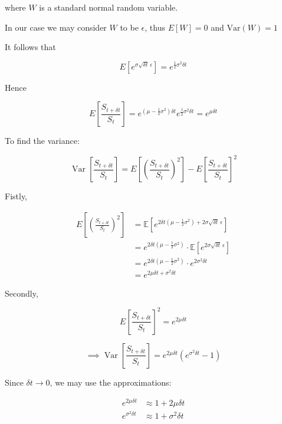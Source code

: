 \documentclass{article}
\begin{document}
    where $W$ is a standard normal random variable.

    \bigskip

    In our case we may consider $W$ to be $\epsilon$, thus $E[W] = 0$ and $\text{Var}(W) = 1$

    It follows that

    \[E\!\left[e^{\sigma \sqrt{\delta t} \, \epsilon}\right] = e^{\frac{1}{2} \sigma^2 \delta t} \]

    Hence

    \begin{equation}
        \label{ev_bintree_dt}
        E\!\left[\frac{S_{t+\delta t}}{S_t}\right] = e^{\left( \mu - \frac{1}{2} \sigma^2 \right) \delta t} e^{\frac{1}{2} \sigma^2 \delta t} = e^{\mu \delta t}
    \end{equation}

    \bigskip

    To find the variance:

    \[\operatorname{Var}\left[\frac{S_{t+\delta t}}{S_t}\right] = E\!\left[\left(\frac{S_{t+\delta t}}{S_t}\right)^2\right] - E\!\left[\frac{S_{t+\delta t}}{S_t}\right]^2\]

    \bigskip

    Fistly,

    \begin{align*}
        E\left[\left(\frac{S_{t+\delta t}}{S_t}\right)^2\right]
        &= \mathbb{E}\!\left[ e^{ 2 \delta t\left( \mu - \frac{1}{2} \sigma^2 \right) + 2 \sigma \sqrt{\delta t} \, \epsilon} \right] \\
        &= e^{2 \delta t\left( \mu - \frac{1}{2} \sigma^2 \right)} \cdot \mathbb{E}\!\left[e^{2 \sigma \sqrt{\delta t} \, \epsilon}\right] \\
        &= e^{2 \delta t\left( \mu - \frac{1}{2} \sigma^2 \right)} \cdot e^{2 \sigma^2 \delta t} \\
        &= e^{2 \mu \delta t + \sigma^2 \delta t}
    \end{align*}

    Secondly,

    \[E\left[\frac{S_{t+\delta t}}{S_t}\right]^2 = e^{2 \mu \delta t}\]

    \bigskip

    \[\implies \operatorname{Var}\left[\frac{S_{t+\delta t}}{S_t}\right] = e^{2 \mu \delta t} (e^{\sigma^2 \delta t} - 1)\]

    Since $\delta t \to 0$, we may use the approximations:

    \begin{align*}
        e^{2 \mu \delta t} &\approx 1 + 2 \mu \delta t \\
        e^{\sigma^2 \delta t} &\approx 1 + \sigma^2 \delta t
    \end{align*}
\end{document}
